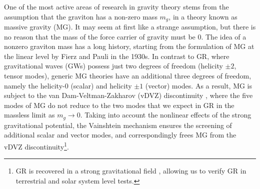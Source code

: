 \documentclass[prd,twocolumn,aps,psfig,nofootinbib,nobibnotes,superscriptaddress,preprintnumbers,times]{revtex4-2}
\begin{document}
One of the most active areas of research in gravity theory stems from the assumption that the graviton has a non-zero mass $m_g$, in a theory known as massive gravity (MG). It may seem at first like a strange assumption, but there is no reason that the mass of the force carrier of gravity must be 0. The idea of a nonzero graviton mass has a long history, starting from the formulation of MG at the linear level by Fierz and Pauli \cite{Fierz:1939ix} in the 1930s. In contrast to GR, where gravitational waves (GWs) possess just two degrees of freedom (helicity $\pm 2$, tensor modes), generic MG theories have an additional three degrees of freedom, namely the helicity-$0$ (scalar) and helicity $\pm 1$ (vector) modes. As a result, MG is subject to the van Dam-Veltman-Zakharov (vDVZ) discontinuity \cite{vanDam:1970vg,Zakharov:1970cc}, where the five modes of MG do not reduce to the two modes that we expect in GR in the massless limit as $m_g \rightarrow 0$. 
Taking into account the nonlinear effects of the strong gravitational potential, the Vainshtein mechanism \cite{Vainshtein:1972sx} ensures the screening of additional scalar and vector modes, and correspondingly frees MG from the vDVZ discontinuity\footnote{GR is recovered in a strong gravitational field \cite{Tasinato:2013rza}, allowing us to verify GR in terrestrial and solar system level tests.}.
\end{document}
